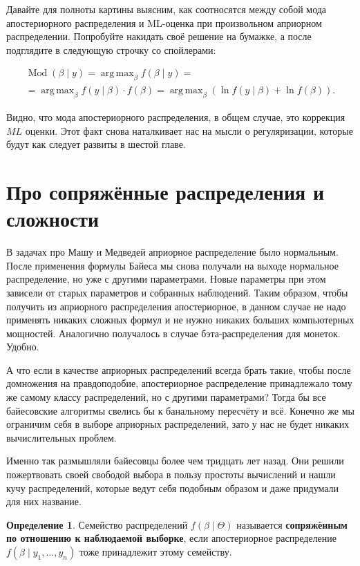 \documentclass[12pt, a4paper, oneside]{extreport}
\DeclareMathOperator*{\argmax}{arg\,max}
\DeclareMathOperator{\Mod}{Mod}
\def \b{\beta}
\newcommand{\indef}[1]{\textbf{#1}}     %
\theoremstyle{plain}              %
\theoremstyle{definition}         %
\newtheorem*{definition}{Определение}  %
\begin{document}
Давайте для полноты картины выясним, как соотносятся между собой мода апостериорного распределения и ML-оценка при произвольном априорном распределении. Попробуйте накидать своё решение на бумажке, а после подглядите в следующую строчку со спойлерами:  

\begin{multline*}
 \Mod(\b \mid y) = \argmax_{\b} f(\b \mid y) = \\ = \argmax_{\b} f(y \mid \b) \cdot f(\b) = \argmax_{\b} (\ln f(y \mid \b) + \ln f(\b)).
 \end{multline*}

Видно, что мода апостериорного распределения, в общем случае, это коррекция $ML$ оценки. Этот факт снова наталкивает нас на мысли о регуляризации, которые будут как следует развиты в шестой главе. 


\section{Про сопряжённые распределения и сложности}

В задачах про Машу и Медведей априорное распределение было нормальным. После применения формулы Байеса мы снова получали на выходе нормальное распределение, но уже с другими параметрами. Новые параметры при этом зависели от старых параметров и собранных наблюдений.  Таким образом, чтобы получить из априорного распределения апостериорное, в данном случае не надо применять никаких сложных формул и не нужно никаких больших компьютерных мощностей. Аналогично получалось в случае бэта-распределения для монеток. Удобно.

А что если в качестве априорных распределений всегда брать такие, чтобы после домножения на правдоподобие, апостериорное распределение принадлежало тому же самому классу распределений, но с другими параметрами? Тогда бы все байесовские алгоритмы свелись бы к банальному пересчёту и всё. Конечно же мы ограничим себя в выборе априорных распределений, зато у нас не будет никаких вычислительных проблем. 

Именно так размышляли байесовцы более чем тридцать лет назад. Они решили пожертвовать своей свободой выбора в пользу простоты вычислений и нашли кучу распределений, которые ведут себя подобным образом и даже придумали для них название.

\begin{definition}
Семейство распределений $f(\beta \mid \Theta)$ называется \indef{сопряжённым по отношению к наблюдаемой выборке}, если  апостериорное распределение $f(\beta \mid y_1, \ldots, y_n)$ тоже принадлежит этому семейству. 
\end{definition}
\end{document}
